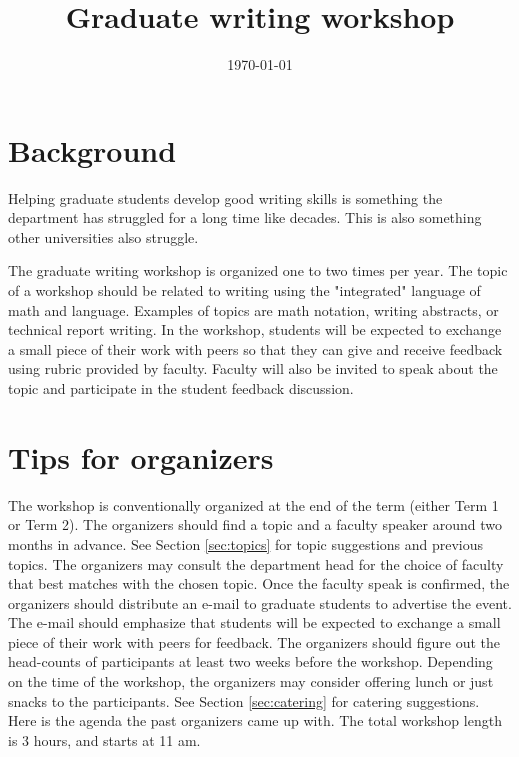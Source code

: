 \documentclass[11pt,a4paper]{article}
\title{Graduate writing workshop}
\date{\today}
\begin{document}
\maketitle

\section{Background}

Helping graduate students develop good writing skills is something the department has struggled for a long time like decades. This is also something other universities also struggle. 

The graduate writing workshop is organized one to two times per year.  The topic of a workshop should be related to writing using the "integrated" language of math and language. Examples of topics are math notation, writing abstracts, or technical report writing. In the workshop, students will be expected to exchange a small piece of their work with peers so that they can give and receive feedback using rubric provided by faculty. Faculty will also be invited to speak about the topic and participate in the student feedback discussion.  


\section{Tips for organizers}

The workshop is conventionally organized at the end of the term (either Term 1 or Term 2). The organizers should find a topic and a faculty speaker around two months in advance. See Section \ref{sec:topics} for topic suggestions and previous topics. The organizers may consult the department head for the choice of faculty that best matches with the chosen topic. Once the faculty speak is confirmed, the organizers should distribute an e-mail to graduate students to advertise the event. The e-mail should emphasize that students will be expected to exchange a small piece of their work with peers for feedback. The organizers should figure out the head-counts of participants at least two weeks before the workshop. 
Depending on the time of the workshop, the organizers may consider offering lunch or just snacks to the participants. See Section \ref{sec:catering} for catering suggestions. 
Here is the agenda the past organizers came up with. The total workshop length is 3 hours, and starts at 11 am. 
\end{document}
